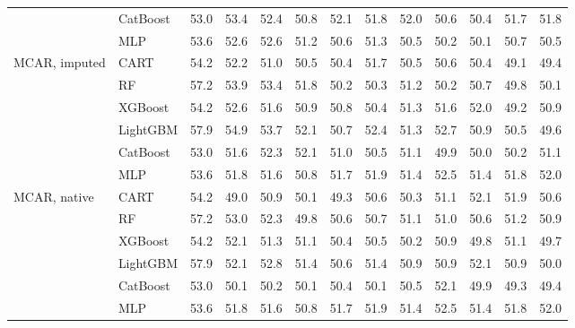 \documentclass[pdflatex,sn-mathphys]{sn-jnl}
\theoremstyle{thmstyleone}
\begin{document}
\begin{table}[htbp]
\begin{tabular}{@{}llrrrrrrrrrrr@{}}
 & CatBoost & 53.0 & 53.4 & 52.4 & 50.8 & 52.1 & 51.8 & 52.0 & 50.6 & 50.4 & 51.7 & 51.8 \\
 & MLP & 53.6 & 52.6 & 52.6 & 51.2 & 50.6 & 51.3 & 50.5 & 50.2 & 50.1 & 50.7 & 50.5 \\
\midrule
MCAR, imputed & CART & 54.2 & 52.2 & 51.0 & 50.5 & 50.4 & 51.7 & 50.5 & 50.6 & 50.4 & 49.1 & 49.4 \\
 & RF & 57.2 & 53.9 & 53.4 & 51.8 & 50.2 & 50.3 & 51.2 & 50.2 & 50.7 & 49.8 & 50.1 \\
 & XGBoost & 54.2 & 52.6 & 51.6 & 50.9 & 50.8 & 50.4 & 51.3 & 51.6 & 52.0 & 49.2 & 50.9 \\
 & LightGBM & 57.9 & 54.9 & 53.7 & 52.1 & 50.7 & 52.4 & 51.3 & 52.7 & 50.9 & 50.5 & 49.6 \\
 & CatBoost & 53.0 & 51.6 & 52.3 & 52.1 & 51.0 & 50.5 & 51.1 & 49.9 & 50.0 & 50.2 & 51.1 \\
 & MLP & 53.6 & 51.8 & 51.6 & 50.8 & 51.7 & 51.9 & 51.4 & 52.5 & 51.4 & 51.8 & 52.0 \\
\midrule
MCAR, native & CART & 54.2 & 49.0 & 50.9 & 50.1 & 49.3 & 50.6 & 50.3 & 51.1 & 52.1 & 51.9 & 50.6 \\
 & RF & 57.2 & 53.0 & 52.3 & 49.8 & 50.6 & 50.7 & 51.1 & 51.0 & 50.6 & 51.2 & 50.9 \\
 & XGBoost & 54.2 & 52.1 & 51.3 & 51.1 & 50.4 & 50.5 & 50.2 & 50.9 & 49.8 & 51.1 & 49.7 \\
 & LightGBM & 57.9 & 52.1 & 52.8 & 51.4 & 50.6 & 51.4 & 50.9 & 50.9 & 52.1 & 50.9 & 50.0 \\
 & CatBoost & 53.0 & 50.1 & 50.2 & 50.1 & 50.4 & 50.1 & 50.5 & 52.1 & 49.9 & 49.3 & 49.4 \\
 & MLP & 53.6 & 51.8 & 51.6 & 50.8 & 51.7 & 51.9 & 51.4 & 52.5 & 51.4 & 51.8 & 52.0 \\
\bottomrule
\end{tabular}
\end{table}
\end{document}
